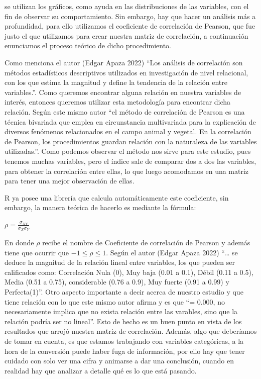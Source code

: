 \documentclass[
  letterpaper,
  DIV=11,
  numbers=noendperiod]{scrreprt}
\begin{document}
se utilizan los gráficos, como ayuda en las distribuciones de las
variables, con el fin de observar su comportamiento. Sin embargo, hay
que hacer un análisis más a profundidad, para ello utilizamos el
coeficiente de correlación de Pearson, que fue justo el que utilizamos
para crear nuestra matriz de correlación, a continuación enunciamos el
proceso teórico de dicho procedimiento.

Como menciona el autor (Edgar Apaza 2022) ``Los análisis de correlación
son métodos estadísticos descriptivos utilizados en investigación de
nivel relacional, con los que estima la magnitud y define la tendencia
de la relación entre variables.''. Como queremos encontrar alguna
relación en nuestra variables de interés, entonces queremos utilizar
esta metodología para encontrar dicha relación. Según este mismo autor
``el método de correlación de Pearson es una técnica bivariada que
emplea en circunstancia multivariada para la explicación de diversos
fenómenos relacionados en el campo animal y vegetal. En la correlación
de Pearson, los procedimientos guardan relación con la naturaleza de las
variables utilizadas.''. Como podemos observar el método nos sirve para
este estudio, pues tenemos muchas variables, pero el índice sale de
comparar dos a dos las variables, para obtener la correlación entre
ellas, lo que luego acomodamos en una matriz para tener una mejor
observación de ellas.

R ya posee una librería que calcula automáticamente este coeficiente,
sin embargo, la manera teórica de hacerlo es mediante la fórmula:

\(\rho = \frac{\sigma_{XY}}{\sigma_X \sigma_Y}\)

En donde \(\rho\) recibe el nombre de Coeficiente de correlación de
Pearson y además tiene que ocurrir que \(-1 \leq \rho \leq 1\). Según el
autor (Edgar Apaza 2022) ``\ldots{} se deduce la magnitud de la relación
lineal entre variables, los que pueden ser calificados como: Correlación
Nula (0), Muy baja (0.01 a 0.1), Débil (0.11 a 0.5), Media (0.51 a
0.75), considerable (0.76 a 0.9), Muy fuerte (0.91 a 0.99) y
Perfecta(1)''. Otro aspecto importante a decir acerca de nuestro estudio
y que tiene relación con lo que este mismo autor afirma y es que
``\rho = 0.000, no necesariamente implica que no exista relación entre
las varables, sino que la relación podría ser no lineal''. Esto de hecho
es un buen punto en vista de los resultados que arrojó nuestra matriz de
correlación. Además, algo que deberíamos de tomar en cuenta, es que
estamos trabajando con variables categóricas, a la hora de la conversión
puede haber fuga de información, por ello hay que tener cuidado con solo
ver una cifra y animarse a dar una conclusión, cuando en realidad hay
que analizar a detalle qué es lo que está pasando.
\end{document}
